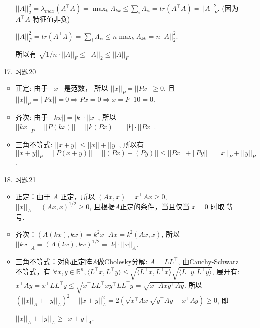\documentclass{article}
\begin{document}
\begin{itemize}
\begin{itemize}
        $||A||_2^2 = \lambda_{max}(A^\top A) = \max_{k} \Lambda_{kk} \leq \sum_{i} \Lambda_{ii} = tr(A^\top A) = ||A||_F^2$. (因为 $A^\top A$ 特征值非负)

        $||A||_F^2 = tr(A^\top A) = \sum_{i} \Lambda_{ii} \leq n \max_{k} \Lambda_{kk} = n ||A||_2^2$. 
        
        所以有 $\sqrt{1/n} \cdot ||A||_F \leq ||A||_2 \leq ||A||_F$

    \end{itemize}
    
    \item [17.] 习题20
    
    \begin{itemize}
        \item 正定: 由于 $||x||$ 是范数， 所以 $||x||_P = ||Px|| \geq 0$, 且 $||x||_P = ||Px|| = 0 \Rightarrow Px=0 \Rightarrow x = P^-1 0 = 0$.
        \item 齐次: 由于 $||kx|| = |k|\cdot ||x||$, 所以  $||kx||_P = ||P(kx)|| = ||k(Px)|| = |k|\cdot ||Px||$.
        \item 三角不等式: $||x+y|| \leq ||x|| + ||y||$, 所以有 $||x + y||_P = ||P(x + y)|| = ||(Px) + (Py)|| \leq ||Px|| + ||Py|| = ||x||_P + ||y||_P$. 
    \end{itemize}
    
    \item [18.] 习题21
    \begin{spacing}{1.25}
    \begin{itemize}
        \item 正定：由于 $A$ 正定，所以 $(Ax, x) = x^\top A x \geq 0$, $||x||_A = (Ax, x)^{1/2} \geq 0$, 且根据$A$正定的条件，当且仅当 $x=0$ 时取 等号.
        \item 齐次：$(A(kx), kx) = k^2 x^\top A x = k^2 (Ax, x)$, 所以 $||kx||_A = (A(kx), kx)^{1/2} = |k|\cdot ||x||_A$.
        \item 三角不等式：对称正定阵$A$做Cholesky分解: $A = LL^\top$, 由Cauchy-Schwarz不等式，有 $\forall x, y\in\mathbb{R}^{n}, \langle L^\top x, L^\top y\rangle \leq \sqrt{\langle L^\top x, L^\top x\rangle}\sqrt{\langle L^\top y, L^\top y\rangle}$, 展开有: 
        $x^\top A y = x^\top LL^\top y \leq \sqrt{x^\top LL^\top x y^\top LL^\top y} = \sqrt{x^\top Axy^\top Ay}$. 所以 $(||x||_A + ||y||_A)^2 - ||x + y||_A^2 = 2\left(\sqrt{x^\top A x}\sqrt{y^\top A y} - x^\top A y\right) \geq 0$, 即 

        $||x||_A + ||y||_A \geq ||x+y||_A$.
    \end{itemize}
    \end{spacing}
    

\end{itemize}
\end{document}
